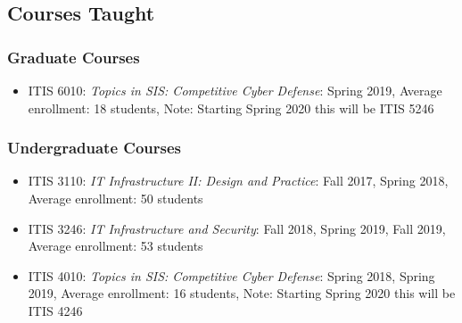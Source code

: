 
\hypertarget{courses}{%
\subsection{Courses Taught}\label{courses}}

\hypertarget{grad-courses}{%
\subsubsection{Graduate Courses}\label{grad-courses}}
\begin{itemize}
\tightlist
\item
  ITIS 6010: \emph{Topics in SIS: Competitive Cyber Defense}: Spring
  2019, Average enrollment: 18 students, Note: Starting Spring 2020 this will be ITIS 5246
\end{itemize}

\hypertarget{undergrad-courses}{%
\subsubsection{Undergraduate Courses}\label{undergrad-courses}}
\begin{itemize}
\tightlist
\item
  ITIS 3110: \emph{IT Infrastructure II: Design and Practice}: Fall
  2017, Spring 2018, Average enrollment: 50 students
\item
  ITIS 3246: \emph{IT Infrastructure and Security}: Fall 2018, Spring
  2019, Fall 2019, Average enrollment: 53 students
\item
  ITIS 4010: \emph{Topics in SIS: Competitive Cyber Defense}: Spring
  2018, Spring 2019, Average enrollment: 16 students, Note: Starting Spring 2020 this will be ITIS 4246
\end{itemize}
